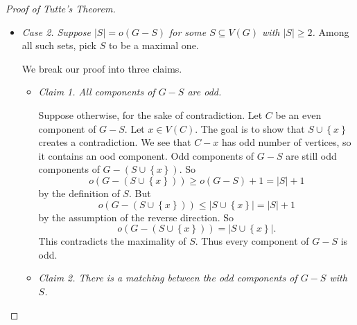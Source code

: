 \documentclass[co342]{subfiles}
\begin{document}
\begin{proof}[Proof of Tutte's Theorem]
\begin{itemize}
\begin{itemize}
                    \item \textit{Case 2. Suppose $\left| S \right|=o\left( G-S \right)$ for some $S\subseteq V\left( G \right)$ with $\left| S \right|\geq 2$.} Among all such sets, pick $S$ to be a maximal one.

                        We break our proof into three claims.
                        \begin{itemize}
                            \item \textit{Claim 1. All components of $G-S$ are odd.}

                                \begin{subproof}
                                    Suppose otherwise, for the sake of contradiction. Let $C$ be an even component of $G-S$. Let $x\in V\left( C \right)$. The goal is to show that $S\cup \left\lbrace x \right\rbrace$ creates a contradiction. We see that $C-x$ has odd number of vertices, so it contains an ood component. Odd components of $G-S$ are still odd components of $G-\left( S\cup \left\lbrace x \right\rbrace \right)$. So
                                    \begin{equation*}
                                        o\left( G-\left( S\cup\left\lbrace x \right\rbrace \right) \right)\geq o\left( G-S \right)+1 = \left| S \right|+1
                                    \end{equation*}
                                    by the definition of $S$. But 
                                    \begin{equation*}
                                        o\left( G-\left( S\cup \left\lbrace x \right\rbrace \right) \right)\leq \left| S\cup \left\lbrace x \right\rbrace \right|=\left| S \right|+1
                                    \end{equation*}
                                    by the assumption of the reverse direction. So
                                    \begin{equation*}
                                        o\left( G-\left( S\cup \left\lbrace x \right\rbrace \right) \right) = \left| S\cup\left\lbrace x \right\rbrace \right|.
                                    \end{equation*}
                                    This contradicts the maximality of $S$. Thus every component of $G-S$ is odd.
                                \end{subproof}

                            \item \textit{Claim 2. There is a matching between the odd components of $G-S$ with $S$.} 


\end{itemize}
\end{itemize}
\end{itemize}
\end{proof}
\end{document}
